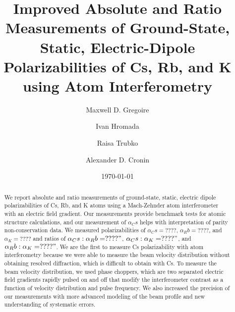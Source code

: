 \documentclass[twocolumn, prl,showpacs,superscriptaddress]{revtex4-1}   %
\begin{document}
\title{Improved Absolute and Ratio Measurements of Ground-State, Static, Electric-Dipole Polarizabilities of Cs, Rb, and K using Atom Interferometry}

\author{Maxwell D. Gregoire}
\author{Ivan Hromada}
\author{Raisa Trubko}
\author{Alexander D. Cronin}

\date{\today}





\begin{abstract}
We report absolute and ratio measurements of ground-state, static, electric dipole polarizabilities of Cs, Rb, and K atoms using a Mach-Zehnder atom interferometer with an electric field gradient. Our measurements provide benchmark tests for atomic structure calculations, and our measurement of $\alpha_Cs$ helps with interpretation of parity non-conservation data. We measured polarizabilities of $\alpha_Cs = ????$, $\alpha_Rb = ????$, and $\alpha_K = ????$ and ratios of $\alpha_Cs:\alpha_Rb = ????"$, $\alpha_Cs:\alpha_K = ????"$, and $\alpha_Rb:\alpha_K = ????"$. We are the first to measure Cs polarizability with atom interferometry because we were able to measure the beam velocity distribution without obtaining resolved diffraction, which is difficult to obtain with Cs. To measure the beam velocity distribution, we used phase choppers, which are two separated electric field gradients rapidly pulsed on and off that modify the interferometer contrast as a function of velocity distribution and pulse frequency. We also increased the precision of our measurements with more advanced modeling of the beam profile and new understanding of systematic errors.
\end{abstract}





\maketitle
\end{document}
